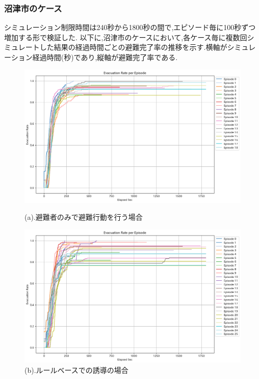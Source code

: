 \subsubsection{沼津市のケース}
シミュレーション制限時間は240秒から1800秒の間で,エピソード毎に100秒ずつ増加する形で検証した.
以下に,沼津市のケースにおいて,各ケース毎に複数回シミュレートした結果の経過時間ごとの避難完了率の推移を示す.横軸がシミュレーション経過時間(秒)であり,縦軸が避難完了率である.
\begin{figure}[H]
  \centering
  \begin{minipage}{0.45\textwidth}
      \centering
      \includegraphics[width=\textwidth]{Figures/Numazu-EvaOnly-ERE.png} %
      \caption{(a).避難者のみで避難行動を行う場合}
      \label{fig:numazu-guid-graph-a}
  \end{minipage}
  \hfill %
  \begin{minipage}{0.45\textwidth}
      \centering
      \includegraphics[width=\textwidth]{Figures/Numazu-RuleModel-ERE.png} %
      \caption{(b).ルールベースでの誘導の場合}
      \label{fig:numazu-guid-graph-b}
  \end{minipage}
  

\end{figure}
